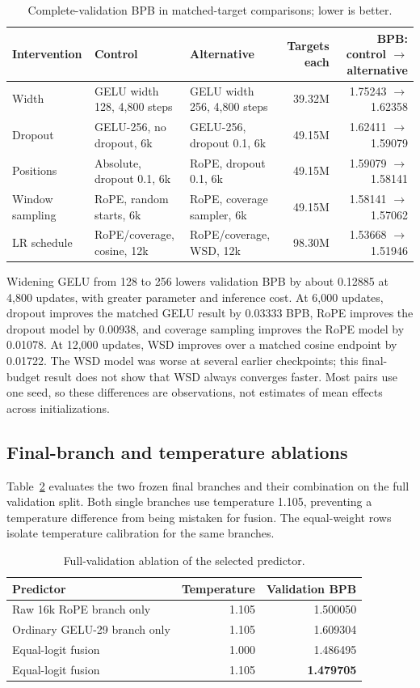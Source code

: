\documentclass[10pt,a4paper]{article}
\begin{document}
\begin{table}[t]
\centering\footnotesize\setlength{\tabcolsep}{3pt}
\caption{Complete-validation BPB in matched-target comparisons; lower is better.}
\label{tab:controls}
\begin{tabularx}{\textwidth}{@{}lXXrr@{}}
\toprule
Intervention & Control & Alternative & Targets each & BPB: control $\to$ alternative \\
\midrule
Width & GELU width 128, 4,800 steps & GELU width 256, 4,800 steps & 39.32M & 1.75243 $\to$ 1.62358 \\
Dropout & GELU-256, no dropout, 6k & GELU-256, dropout 0.1, 6k & 49.15M & 1.62411 $\to$ 1.59079 \\
Positions & Absolute, dropout 0.1, 6k & RoPE, dropout 0.1, 6k & 49.15M & 1.59079 $\to$ 1.58141 \\
Window sampling & RoPE, random starts, 6k & RoPE, coverage sampler, 6k & 49.15M & 1.58141 $\to$ 1.57062 \\
LR schedule & RoPE/coverage, cosine, 12k & RoPE/coverage, WSD, 12k & 98.30M & 1.53668 $\to$ 1.51946 \\
\bottomrule
\end{tabularx}
\end{table}

Widening GELU from 128 to 256 lowers validation BPB by about 0.12885 at 4,800 updates, with greater parameter and inference cost. At 6,000 updates, dropout improves the matched GELU result by 0.03333 BPB, RoPE improves the dropout model by 0.00938, and coverage sampling improves the RoPE model by 0.01078. At 12,000 updates, WSD improves over a matched cosine endpoint by 0.01722. The WSD model was worse at several earlier checkpoints; this final-budget result does not show that WSD always converges faster. Most pairs use one seed, so these differences are observations, not estimates of mean effects across initializations.

\subsection{Final-branch and temperature ablations}
Table~\ref{tab:branches} evaluates the two frozen final branches and their combination on the full validation split. Both single branches use temperature 1.105, preventing a temperature difference from being mistaken for fusion. The equal-weight rows isolate temperature calibration for the same branches.

\begin{table}[t]
\centering\small
\caption{Full-validation ablation of the selected predictor.}
\label{tab:branches}
\begin{tabularx}{0.88\textwidth}{@{}Xrr@{}}
\toprule
Predictor & Temperature & Validation BPB \\
\midrule
Raw 16k RoPE branch only & 1.105 & 1.500050 \\
Ordinary GELU-29 branch only & 1.105 & 1.609304 \\
Equal-logit fusion & 1.000 & 1.486495 \\
Equal-logit fusion & 1.105 & \textbf{1.479705} \\
\bottomrule
\end{tabularx}
\end{table}
\end{document}
